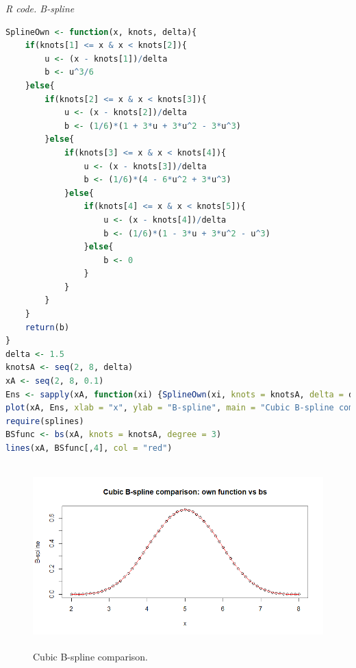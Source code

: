 \begin{tcolorbox}[enhanced,width=4.67in,center upper,
	fontupper=\large\bfseries,drop shadow southwest,sharp corners]
	\textit{R code. B-spline}
	\begin{VF}
		\begin{lstlisting}[language=R]
SplineOwn <- function(x, knots, delta){
	if(knots[1] <= x & x < knots[2]){
		u <- (x - knots[1])/delta
		b <- u^3/6
	}else{
		if(knots[2] <= x & x < knots[3]){
			u <- (x - knots[2])/delta
			b <- (1/6)*(1 + 3*u + 3*u^2 - 3*u^3)
		}else{
			if(knots[3] <= x & x < knots[4]){
				u <- (x - knots[3])/delta
				b <- (1/6)*(4 - 6*u^2 + 3*u^3)
			}else{
				if(knots[4] <= x & x < knots[5]){
					u <- (x - knots[4])/delta
					b <- (1/6)*(1 - 3*u + 3*u^2 - u^3)
				}else{
					b <- 0
				}
			}
		}
	}
	return(b)
}
delta <- 1.5
knotsA <- seq(2, 8, delta)
xA <- seq(2, 8, 0.1)
Ens <- sapply(xA, function(xi) {SplineOwn(xi, knots = knotsA, delta = delta)})
plot(xA, Ens, xlab = "x", ylab = "B-spline", main = "Cubic B-spline comparison: own function vs bs")
require(splines)
BSfunc <- bs(xA, knots = knotsA, degree = 3)
lines(xA, BSfunc[,4], col = "red")
\end{lstlisting}
	\end{VF}
\end{tcolorbox}

\begin{figure}[!h]
	\includegraphics[width=340pt, height=200pt]{Chapters/chapter11/figures/CubicBspline.png}
	\caption[List of figure caption goes here]{Cubic B-spline comparison.}\label{figCubicBspline}
\end{figure}

